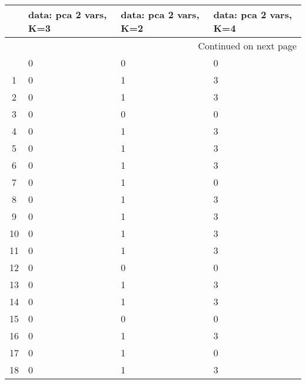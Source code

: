 \begin{longtable}{cp{3cm}p{3cm}p{3cm}}
\toprule
{} &  data: pca 2 vars, K=3 &  data: pca 2 vars, K=2 &  data: pca 2 vars, K=4 \\
\midrule
\endhead
\midrule
\multicolumn{4}{r}{{Continued on next page}} \\
\midrule
\endfoot

\bottomrule
\endlastfoot
0  &                      0 &                      0 &                      0 \\
1  &                      0 &                      1 &                      3 \\
2  &                      0 &                      1 &                      3 \\
3  &                      0 &                      0 &                      0 \\
4  &                      0 &                      1 &                      3 \\
5  &                      0 &                      1 &                      3 \\
6  &                      0 &                      1 &                      3 \\
7  &                      0 &                      1 &                      0 \\
8  &                      0 &                      1 &                      3 \\
9  &                      0 &                      1 &                      3 \\
10 &                      0 &                      1 &                      3 \\
11 &                      0 &                      1 &                      3 \\
12 &                      0 &                      0 &                      0 \\
13 &                      0 &                      1 &                      3 \\
14 &                      0 &                      1 &                      3 \\
15 &                      0 &                      0 &                      0 \\
16 &                      0 &                      1 &                      3 \\
17 &                      0 &                      1 &                      0 \\
18 &                      0 &                      1 &                      3 \\

\end{longtable}
